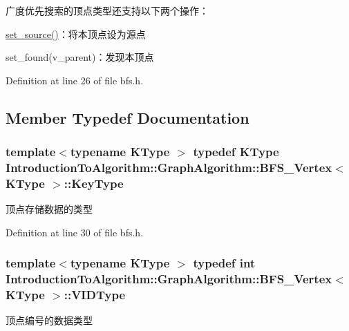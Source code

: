 广度优先搜索的顶点类型还支持以下两个操作：


\begin{DoxyItemize}
\item {\ttfamily \hyperlink{struct_introduction_to_algorithm_1_1_graph_algorithm_1_1_b_f_s___vertex_a3f5b9ba686fae02e01cd899261fe6793}{set\+\_\+source()}}：将本顶点设为源点
\item {\ttfamily set\+\_\+found(v\+\_\+parent)}：发现本顶点 
\end{DoxyItemize}

Definition at line 26 of file bfs.\+h.



\subsection{Member Typedef Documentation}
\hypertarget{struct_introduction_to_algorithm_1_1_graph_algorithm_1_1_b_f_s___vertex_a1e47ba34939458c68d7ccee8ebeccad2}{}
\subsubsection[{Key\+Type}]{\setlength{\rightskip}{0pt plus 5cm}template$<$typename K\+Type $>$ typedef K\+Type {\bf Introduction\+To\+Algorithm\+::\+Graph\+Algorithm\+::\+B\+F\+S\+\_\+\+Vertex}$<$ K\+Type $>$\+::{\bf Key\+Type}}\label{struct_introduction_to_algorithm_1_1_graph_algorithm_1_1_b_f_s___vertex_a1e47ba34939458c68d7ccee8ebeccad2}
顶点存储数据的类型 

Definition at line 30 of file bfs.\+h.

\hypertarget{struct_introduction_to_algorithm_1_1_graph_algorithm_1_1_b_f_s___vertex_a62cef758843cdaeefae2fc196f6bdb46}{}
\subsubsection[{V\+I\+D\+Type}]{\setlength{\rightskip}{0pt plus 5cm}template$<$typename K\+Type $>$ typedef int {\bf Introduction\+To\+Algorithm\+::\+Graph\+Algorithm\+::\+B\+F\+S\+\_\+\+Vertex}$<$ K\+Type $>$\+::{\bf V\+I\+D\+Type}}\label{struct_introduction_to_algorithm_1_1_graph_algorithm_1_1_b_f_s___vertex_a62cef758843cdaeefae2fc196f6bdb46}
顶点编号的数据类型 

